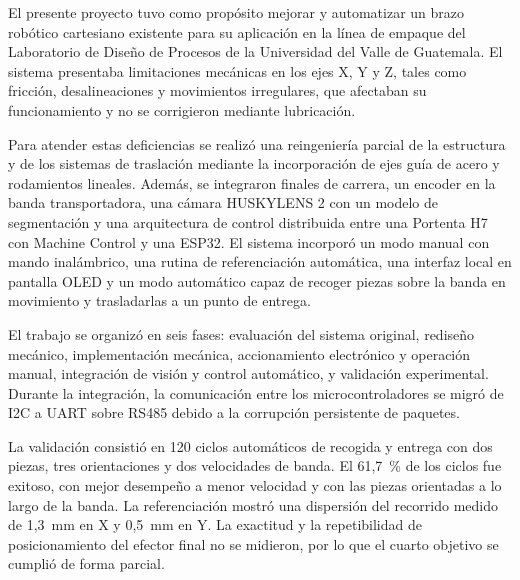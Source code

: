 El presente proyecto tuvo como propósito mejorar y automatizar un brazo robótico cartesiano existente para su aplicación en la línea de empaque del Laboratorio de Diseño de Procesos de la Universidad del Valle de Guatemala. El sistema presentaba limitaciones mecánicas en los ejes X, Y y Z, tales como fricción, desalineaciones y movimientos irregulares, que afectaban su funcionamiento y no se corrigieron mediante lubricación.

Para atender estas deficiencias se realizó una reingeniería parcial de la estructura y de los sistemas de traslación mediante la incorporación de ejes guía de acero y rodamientos lineales. Además, se integraron finales de carrera, un encoder en la banda transportadora, una cámara HUSKYLENS 2 con un modelo de segmentación y una arquitectura de control distribuida entre una Portenta H7 con Machine Control y una ESP32. El sistema incorporó un modo manual con mando inalámbrico, una rutina de referenciación automática, una interfaz local en pantalla OLED y un modo automático capaz de recoger piezas sobre la banda en movimiento y trasladarlas a un punto de entrega.

El trabajo se organizó en seis fases: evaluación del sistema original, rediseño mecánico, implementación mecánica, accionamiento electrónico y operación manual, integración de visión y control automático, y validación experimental. Durante la integración, la comunicación entre los microcontroladores se migró de I2C a UART sobre RS485 debido a la corrupción persistente de paquetes.

La validación consistió en 120 ciclos automáticos de recogida y entrega con dos piezas, tres orientaciones y dos velocidades de banda. El 61,7~\% de los ciclos fue exitoso, con mejor desempeño a menor velocidad y con las piezas orientadas a lo largo de la banda. La referenciación mostró una dispersión del recorrido medido de 1,3~mm en X y 0,5~mm en Y. La exactitud y la repetibilidad de posicionamiento del efector final no se midieron, por lo que el cuarto objetivo se cumplió de forma parcial.
